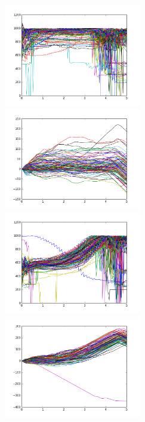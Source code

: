 \documentclass[a4paper, 11pt]{article} %
\begin{document}
\begin{figure}[H]
\begin{minipage}{0.5\linewidth}
\centerline{\includegraphics[width=6.0cm]{figure/originf0_1.png}}
\end{minipage}
\hfill
\begin{minipage}{0.5\linewidth}
\centerline{\includegraphics[width=6.0cm]{figure/finalnorm_1.png}}
\end{minipage}
\vfill
\begin{minipage}{0.5\linewidth}
\centerline{\includegraphics[width=6.0cm]{figure/originf0_2.png}}
\end{minipage}
\hfill
\begin{minipage}{0.5\linewidth}
\centerline{\includegraphics[width=6.0cm]{figure/finalnorm_2.png}}

\end{minipage}
\end{figure}
\end{document}
